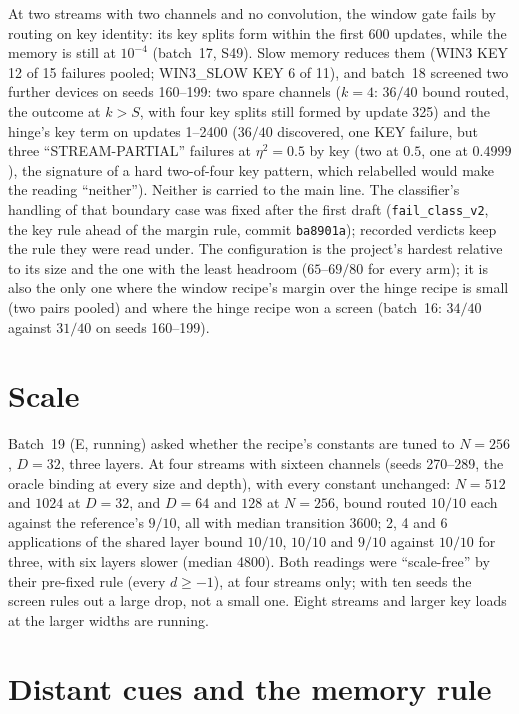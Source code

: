 \documentclass[11pt]{article}
\newcommand{\arm}[1]{\textsf{#1}}
\begin{document}
At two streams with two channels and no convolution, the window gate fails by routing on key identity: its key splits form within the first 600 updates, while the memory is still at $10^{-4}$ (batch~17, S49). Slow memory reduces them (\arm{WIN3} KEY 12 of 15 failures pooled; \arm{WIN3\_SLOW} KEY 6 of 11), and batch~18 screened two further devices on seeds 160--199: two spare channels ($k = 4$: $36/40$ bound routed, the outcome at $k > S$, with four key splits still formed by update 325) and the hinge's key term on updates 1--2400 ($36/40$ discovered, one KEY failure, but three ``STREAM-PARTIAL'' failures at $\eta^2 = 0.5$ by key (two at $0.5$, one at $0.4999$), the signature of a hard two-of-four key pattern, which relabelled would make the reading ``neither''). Neither is carried to the main line. The classifier's handling of that boundary case was fixed after the first draft (\texttt{fail\_class\_v2}, the key rule ahead of the margin rule, commit \texttt{ba8901a}); recorded verdicts keep the rule they were read under. The configuration is the project's hardest relative to its size and the one with the least headroom ($65$--$69/80$ for every arm); it is also the only one where the window recipe's margin over the hinge recipe is small (two pairs pooled) and where the hinge recipe won a screen (batch~16: $34/40$ against $31/40$ on seeds 160--199).

\section{Scale}
\label{sec:scale}

Batch~19 (E, running) asked whether the recipe's constants are tuned to $N = 256$, $D = 32$, three layers. At four streams with sixteen channels (seeds 270--289, the oracle binding at every size and depth), with every constant unchanged: $N = 512$ and $1024$ at $D = 32$, and $D = 64$ and $128$ at $N = 256$, bound routed $10/10$ each against the reference's $9/10$, all with median transition 3600; 2, 4 and 6 applications of the shared layer bound $10/10$, $10/10$ and $9/10$ against $10/10$ for three, with six layers slower (median 4800). Both readings were ``scale-free'' by their pre-fixed rule (every $d \geq -1$), at four streams only; with ten seeds the screen rules out a large drop, not a small one. Eight streams and larger key loads at the larger widths are running.

\section{Distant cues and the memory rule}
\label{sec:far}
\end{document}
